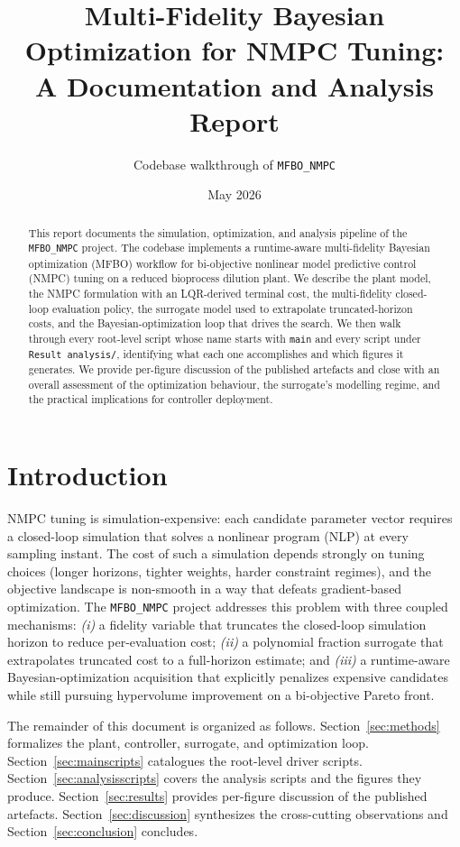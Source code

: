 \documentclass[11pt,a4paper]{article}
\title{Multi-Fidelity Bayesian Optimization for NMPC Tuning:\\
A Documentation and Analysis Report}
\author{Codebase walkthrough of \texttt{MFBO\_NMPC}}
\date{May 2026}
\begin{document}
\maketitle

\begin{abstract}
This report documents the simulation, optimization, and analysis pipeline of the \texttt{MFBO\_NMPC} project. The codebase implements a runtime-aware multi-fidelity Bayesian optimization (MFBO) workflow for bi-objective nonlinear model predictive control (NMPC) tuning on a reduced bioprocess dilution plant. We describe the plant model, the NMPC formulation with an LQR-derived terminal cost, the multi-fidelity closed-loop evaluation policy, the surrogate model used to extrapolate truncated-horizon costs, and the Bayesian-optimization loop that drives the search. We then walk through every root-level script whose name starts with \texttt{main} and every script under \texttt{Result analysis/}, identifying what each one accomplishes and which figures it generates. We provide per-figure discussion of the published artefacts and close with an overall assessment of the optimization behaviour, the surrogate's modelling regime, and the practical implications for controller deployment.
\end{abstract}

\section{Introduction}

NMPC tuning is simulation-expensive: each candidate parameter vector requires a closed-loop simulation that solves a nonlinear program (NLP) at every sampling instant. The cost of such a simulation depends strongly on tuning choices (longer horizons, tighter weights, harder constraint regimes), and the objective landscape is non-smooth in a way that defeats gradient-based optimization. The \texttt{MFBO\_NMPC} project addresses this problem with three coupled mechanisms: \textit{(i)} a fidelity variable that truncates the closed-loop simulation horizon to reduce per-evaluation cost; \textit{(ii)} a polynomial fraction surrogate that extrapolates truncated cost to a full-horizon estimate; and \textit{(iii)} a runtime-aware Bayesian-optimization acquisition that explicitly penalizes expensive candidates while still pursuing hypervolume improvement on a bi-objective Pareto front.

The remainder of this document is organized as follows. Section~\ref{sec:methods} formalizes the plant, controller, surrogate, and optimization loop. Section~\ref{sec:mainscripts} catalogues the root-level driver scripts. Section~\ref{sec:analysisscripts} covers the analysis scripts and the figures they produce. Section~\ref{sec:results} provides per-figure discussion of the published artefacts. Section~\ref{sec:discussion} synthesizes the cross-cutting observations and Section~\ref{sec:conclusion} concludes.
\end{document}

